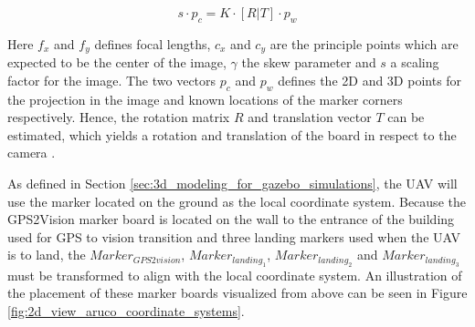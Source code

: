 \documentclass[../Head/report.tex]{subfiles}
\begin{document}
\begin{equation}
	s \cdot p_{c} = K \cdot[R|T] \cdot p_{w}
	\label{eq:pnp_simplified}
\end{equation}

Here $f_x$ and $f_y$ defines focal lengths, $c_x$ and $c_y$ are the principle points which are expected to be the center of the image, $\gamma$ the skew parameter and $s$ a scaling factor for the image. The two vectors $p_c$ and $p_w$ defines the 2D and 3D points for the projection in the image and known locations of the marker corners respectively. Hence, the rotation matrix $R$ and translation vector $T$ can be estimated, which yields a rotation and translation of the board in respect to the camera \cite{estimatePoseBoard}. 

As defined in Section \ref{sec:3d_modeling_for_gazebo_simulations}, the UAV will use the marker located on the ground as the local coordinate system. Because the GPS2Vision marker board is located on the wall to the entrance of the building used for GPS to vision transition and three landing markers used when the UAV is to land, the $Marker_{GPS2vision}$, $Marker_{landing_1}$, $Marker_{landing_2}$ and $Marker_{landing_3}$ must be transformed to align with the local coordinate system. An illustration of the placement of these marker boards visualized from above can be seen in Figure \ref{fig:2d_view_aruco_coordinate_systems}. 
\end{document}

